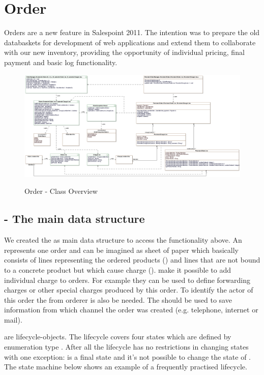 \newpage
\section{Order}
Orders are a new feature in Salespoint 2011. The intention was to prepare the old databaskets for development of web applications and extend them to collaborate with our new inventory, providing the opportunity of individual pricing, final payment and basic log functionality.

\begin{figure}[ht]
	\centering
  \includegraphics[width=1.0\textwidth]{images/Order_Overview.eps}
	\label{order_overview}
	\caption{Order - Class Overview}
\end{figure}

\subsection{ - The main data structure}
We created the  as main data structure to access the functionality above. An  represents one order and can be imagined as sheet of paper which basically consists of lines representing the ordered products () and lines that are not bound to a concrete product but which cause charge ().  make it possible to add individual charge to orders. For example they can be used to define forwarding charges or other special charges produced by this order.
To identify the actor of this order the  from orderer is also be needed. The  should be used to save information from which channel the order was created (e.g. telephone, internet or mail).

 are lifecycle-objects. The lifecycle covers four states which are defined by enumeration type . After all the lifecycle has no restrictions in changing states with one exception:  is a final state and it's not possible to change the state of  . The state machine below shows an example of a frequently practised lifecycle.

